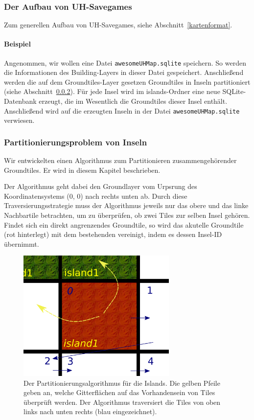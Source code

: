 \subsubsection{Der Aufbau von UH-Savegames}
Zum generellen Aufbau von UH-Savegames, siehe Abschnitt~\ref{kartenformat}.

\paragraph{Beispiel} Angenommen, wir wollen eine Datei {\tt awesomeUHMap.sqlite}
speichern. So werden die Informationen des Building-Layers in dieser Datei
gespeichert. Anschließend werden die auf dem Groundtiles-Layer gesetzen
Groundtiles in Inseln partitioniert (siehe Abschnitt~\ref{sec:partionierung}).
Für jede Insel wird im islands-Ordner eine neue SQLite-Datenbank erzeugt, die im
Wesentlich die Groundtiles dieser Insel enthält. Anschließend wird auf die
erzeugten Inseln in der Datei {\tt awesomeUHMap.sqlite} verwiesen.

\subsubsection{Partitionierungsproblem von Inseln}
\label{sec:partionierung}
Wir entwickelten einen Algorithmus zum Partitionieren zusammengehörender
Groundtiles. Er wird in diesem Kapitel beschrieben.

Der Algorithmus geht dabei den Groundlayer vom Urpsrung des Koordinatensystems
(0, 0) nach rechts unten ab. Durch diese Traversierungsstrategie muss der Algorithmus
jeweils nur das obere und das linke Nachbartile betrachten, um zu überprüfen, ob
zwei Tiles zur selben Insel gehören. Findet sich
ein direkt angrenzendes Groundtile, so wird das akutelle Groundtile (rot
hinterlegt) mit dem bestehenden vereinigt, indem es dessen Insel-ID übernimmt.

%
%
\begin{figure}[htbp]
  \centering

    \includegraphics[width=0.7\textwidth]{gfx/merge_algorithm.png}

  \caption{Der Partitionierungsalgorithmus für die Islands. Die gelben Pfeile
  geben an, welche Gitterflächen auf das Vorhandensein von Tiles überprüft
  werden. Der Algorithmus traversiert die Tiles von oben links nach unten
  rechts (blau eingezeichnet).}
  \label{figure:automaton-intersection}
\end{figure}

